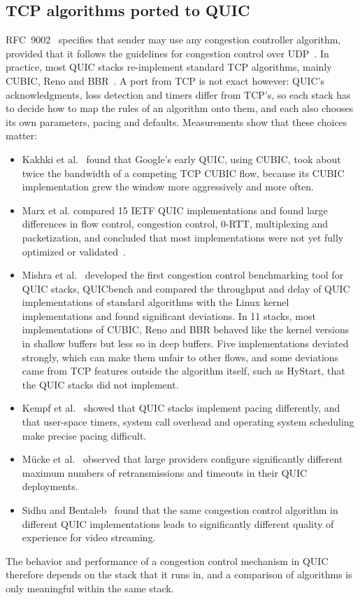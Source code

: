 \subsection{TCP algorithms ported to QUIC}\label{sec:rw-quic-ports}

RFC~9002~\cite{rfc9002} specifies that
sender may use any congestion controller algorithm, provided that it follows the guidelines for
congestion control over UDP~\cite{rfc8085}. In practice, most QUIC stacks
re-implement standard TCP algorithms, mainly CUBIC, Reno and BBR~\cite{mishra2023cambrian}. A port from TCP is not exact however: QUIC's acknowledgments, loss detection and timers differ
from TCP's, so each stack has to decide how to map
the rules of an algorithm onto them, and each also chooses its own parameters, pacing
and defaults. Measurements show that these choices matter:
\begin{itemize}
  \item Kakhki et al.~\cite{kakhki2017long} found that Google's early QUIC, using CUBIC, took about twice the
    bandwidth of a competing TCP CUBIC flow, because its CUBIC implementation grew the
    window more aggressively and more often.
  \item Marx et al.\cite{marx2020same} compared 15 IETF QUIC implementations and found large differences
    in flow control, congestion control, 0-RTT, multiplexing and packetization, and
    concluded that most implementations were not yet fully optimized or
    validated~.
  \item Mishra et al.~\cite{mishra2023cambrian, mishra2022speciation} developed the first congestion control benchmarking tool for QUIC stacks, QUICbench and compared the throughput and delay of QUIC implementations of
    standard algorithms with the Linux kernel implementations and found significant
    deviations. In 11 stacks, most
    implementations of CUBIC, Reno and BBR behaved like the kernel versions in shallow
    buffers but less so in deep buffers. Five implementations deviated strongly, which
    can make them unfair to other flows, and some deviations came from TCP features
    outside the algorithm itself, such as HyStart, that the QUIC stacks did not
    implement.
  \item Kempf et al.~\cite{kempf2025quicsteps} showed that QUIC stacks implement pacing differently, and that
    user-space timers, system call overhead and operating system scheduling make
    precise pacing difficult.
  \item Mücke et al.~\cite{mucke2025waiting} observed that large providers configure significantly different
    maximum numbers of retransmissions and timeouts in their QUIC
    deployments.
  \item Sidhu and Bentaleb~\cite{sidhu2026video} found that the same congestion control algorithm in
    different QUIC implementations leads to significantly different quality of
    experience for video streaming.
\end{itemize}
The behavior and performance of a congestion control mechanism in QUIC therefore depends on the stack that it runs in, and a
comparison of algorithms is only meaningful within the same stack.

